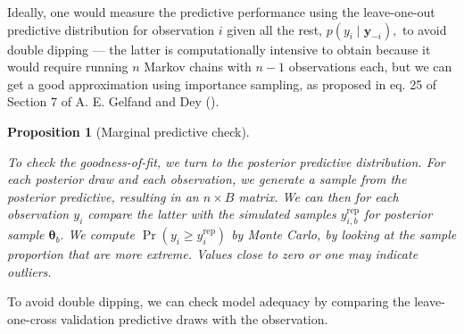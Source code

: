 \documentclass[
  11pt,
  letterpaper,
]{scrbook}
\theoremstyle{plain}
\theoremstyle{plain}
\newtheorem{proposition}{Proposition}[chapter]
\theoremstyle{plain}
\theoremstyle{definition}
\theoremstyle{definition}
\theoremstyle{definition}
\theoremstyle{remark}
\begin{document}
Ideally, one would measure the predictive performance using the
leave-one-out predictive distribution for observation \(i\) given all
the rest, \(p(y_i \mid \boldsymbol{y}_{-i}),\) to avoid double dipping
--- the latter is computationally intensive to obtain because it would
require running \(n\) Markov chains with \(n-1\) observations each, but
we can get a good approximation using importance sampling, as proposed
in eq. 25 of Section 7 of A. E. Gelfand and Dey
().

\begin{proposition}[Marginal predictive
check]\protect\hypertarget{prp-marginal-pred-checks}{}\label{prp-marginal-pred-checks}

To check the goodness-of-fit, we turn to the posterior predictive
distribution. For each posterior draw and each observation, we generate
a sample from the posterior predictive, resulting in an \(n \times B\)
matrix. We can then for each observation \(y_i\) compare the latter with
the simulated samples \(y_{i,b}^{\mathrm{rep}}\) for posterior sample
\(\boldsymbol{\theta}_b.\) We compute
\(\Pr(y_i \geq y_{i}^{\mathrm{rep}})\) by Monte Carlo, by looking at the
sample proportion that are more extreme. Values close to zero or one may
indicate outliers.

\end{proposition}

To avoid double dipping, we can check model adequacy by comparing the
leave-one-cross validation predictive draws with the observation.
\end{document}
